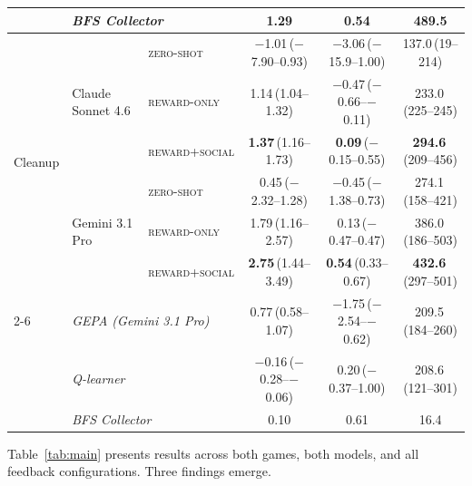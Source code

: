 \documentclass{nextgame2026} %
\begin{document}
\begin{table}[t]
\begin{tabular}{@{}ll l ccc @{}}
  & \multicolumn{2}{l}{\color{gray}\emph{BFS Collector}}
                                    & \color{gray}1.29  & \color{gray}0.54  & \color{gray}489.5   \\
\midrule
\multirow{6}{*}{Cleanup}
  & \multirow{3}{*}{Claude Sonnet 4.6}
  & \textsc{zero-shot}                          & $-$1.01\,{\scriptsize($-$7.90--0.93)}  & $-$3.06\,{\scriptsize($-$15.9--1.00)}  & 137.0\,{\scriptsize(19--214)}   \\
  & & \textsc{reward-only}           & 1.14\,{\scriptsize(1.04--1.32)}  & $-$0.47\,{\scriptsize($-$0.66--$-$0.11)}  & 233.0\,{\scriptsize(225--245)}  \\
  & & \textsc{reward+social}       & \textbf{1.37}\,{\scriptsize(1.16--1.73)}  & \textbf{0.09}\,{\scriptsize($-$0.15--0.55)}  & \textbf{294.6}\,{\scriptsize(209--456)}  \\
  \cmidrule{2-6}
  & \multirow{3}{*}{Gemini 3.1 Pro}
  & \textsc{zero-shot}                          & 0.45\,{\scriptsize($-$2.32--1.28)}  & $-$0.45\,{\scriptsize($-$1.38--0.73)}  & 274.1\,{\scriptsize(158--421)}  \\
  & & \textsc{reward-only}           & 1.79\,{\scriptsize(1.16--2.57)}  & 0.13\,{\scriptsize($-$0.47--0.47)}  & 386.0\,{\scriptsize(186--503)}  \\
  & & \textsc{reward+social}       & \textbf{2.75}\,{\scriptsize(1.44--3.49)}  & \textbf{0.54}\,{\scriptsize(0.33--0.67)}  & \textbf{432.6}\,{\scriptsize(297--501)}  \\
  \cmidrule{2-6}
  & \multicolumn{2}{l}{\color{gray}\emph{GEPA (Gemini 3.1 Pro)}}
                                    & \color{gray}0.77\,{\scriptsize(0.58--1.07)}  & \color{gray}$-$1.75\,{\scriptsize($-$2.54--$-$0.62)}  & \color{gray}209.5\,{\scriptsize(184--260)}  \\
  & \multicolumn{2}{l}{\color{gray}\emph{Q-learner}}
                                    & \color{gray}$-$0.16\,{\scriptsize($-$0.28--$-$0.06)}  & \color{gray}0.20\,{\scriptsize($-$0.37--1.00)}  & \color{gray}208.6\,{\scriptsize(121--301)}  \\
  & \multicolumn{2}{l}{\color{gray}\emph{BFS Collector}}
                                    & \color{gray}0.10  & \color{gray}0.61  & \color{gray}16.4   \\
\bottomrule
\end{tabular}
\end{table}

Table~\ref{tab:main} presents results across both games, both models,
and all feedback configurations.  Three findings emerge.
\end{document}
